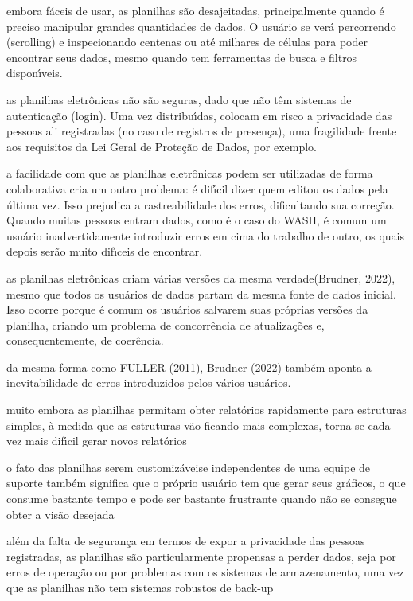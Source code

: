 \documentclass[
12pt,		%
openright,	%
twoside,  %
a4paper,			%
chapter=TITLE,		%
english,			%
french,				%
spanish,			%
brazil				%
]{USPSC-classe/USPSC}
\begin{document}
\begin{alineas}
\item embora f\'aceis de usar, as planilhas s\~ao desajeitadas, principalmente quando \'e preciso manipular grandes quantidades de dados. O usu\'ario se ver\'a percorrendo (scrolling) e inspecionando centenas ou at\'e milhares de c\'elulas para poder encontrar seus dados, mesmo quando tem ferramentas de busca e filtros dispon\'{\i}veis.
\item as planilhas eletr\^onicas n\~ao s\~ao seguras, dado que n\~ao t\^em sistemas de autentica\c{c}\~ao (login). Uma vez distribu\'{\i}das, colocam em risco a privacidade das pessoas ali registradas (no caso de registros de presen\c{c}a), uma fragilidade frente aos requisitos da Lei Geral de Prote\c{c}\~ao de Dados, por exemplo.
\item a facilidade com que as planilhas eletr\^onicas podem ser utilizadas de forma colaborativa cria um outro problema: \'e dif\'{\i}cil dizer quem editou os dados pela \'ultima vez. Isso prejudica a rastreabilidade dos erros, dificultando sua corre\c{c}\~ao. Quando muitas pessoas entram dados, como \'e o caso do WASH, \'e comum um usu\'ario inadvertidamente introduzir erros em cima do trabalho de outro, os quais depois ser\~ao muito dif\'{\i}ceis de encontrar.
\item as planilhas eletr\^onicas criam v\'arias vers\~oes da mesma \textquotedbl verdade\textquotedbl   (Brudner, 2022), mesmo que todos os usu\'arios de dados partam da mesma fonte de dados inicial. Isso ocorre porque \'e comum os usu\'arios salvarem suas pr\'oprias vers\~oes da planilha, criando um problema de concorr\^encia de atualiza\c{c}\~oes e, consequentemente, de coer\^encia.
\item da mesma forma como  FULLER (2011),  Brudner (2022) tamb\'em aponta a inevitabilidade de erros introduzidos pelos v\'arios usu\'arios.
\item muito embora as planilhas permitam obter relat\'orios rapidamente para estruturas simples, \`a medida que as estruturas v\~ao ficando mais complexas, torna-se cada vez mais dif\'{\i}cil gerar novos relat\'orios
\item o fato das planilhas serem \textquotedbl customiz\'aveis\textquotedbl  e independentes de uma equipe de suporte tamb\'em significa que o pr\'oprio usu\'ario tem que gerar seus gr\'aficos, o que consume bastante tempo e pode ser bastante frustrante quando n\~ao se consegue obter a vis\~ao desejada
\item al\'em da falta de seguran\c{c}a em termos de expor a privacidade das pessoas registradas, as planilhas s\~ao particularmente propensas a perder dados, seja por erros de opera\c{c}\~ao ou por problemas com os sistemas de armazenamento, uma vez que as planilhas n\~ao tem sistemas robustos de \textquotedbl back-up\textquotedbl 

\end{alineas}
\end{document}
